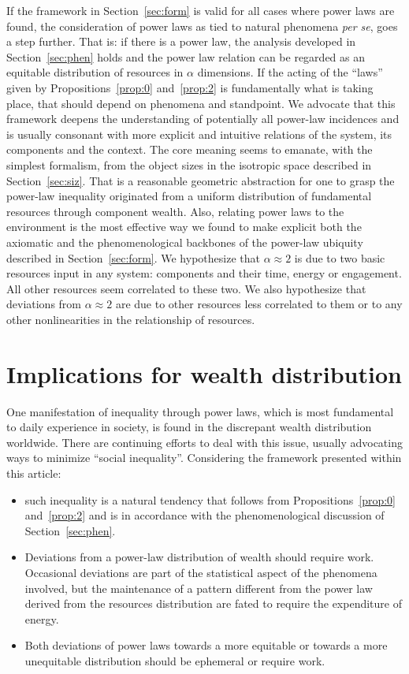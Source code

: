\documentclass[10pt,letterpaper]{article}
\begin{document}
If the framework in Section~\ref{sec:form} is valid for all cases where power laws are found,
the consideration of power laws as tied to natural phenomena \emph{per se}, goes a step further. 
That is: if there is
a power law, the analysis developed in Section~\ref{sec:phen} holds
and
the power law relation can be regarded as an equitable distribution
of resources in $\alpha$ dimensions.
If the acting of the ``laws'' given by Propositions~\ref{prop:0} and~\ref{prop:2} is fundamentally what is taking place, that should depend on phenomena
and standpoint.
We advocate that this framework deepens the understanding of potentially all power-law
incidences and is usually consonant with more explicit and intuitive 
relations of the system, its components and the context.
The core meaning seems to emanate, with the simplest formalism, from
the object sizes in the isotropic space described in Section~\ref{sec:siz}.
That is a reasonable geometric abstraction for
one to grasp the power-law inequality originated from
a uniform distribution
of fundamental resources through component wealth.
Also, relating power laws to the environment is the most effective
way we found to make explicit both the axiomatic
and the phenomenological backbones of the power-law ubiquity described in
Section~\ref{sec:form}.
We hypothesize that $\alpha \approx 2$ is due to two basic resources
input in any system: components and their time, energy or engagement.
All other resources seem correlated to these two.
We also hypothesize that deviations from $\alpha \approx 2$ are due
to other resources less correlated to them
or to any other nonlinearities in the relationship of resources.

\section{Implications for wealth distribution}\label{sec:esp}

One manifestation of inequality through power laws,
which is most fundamental to daily experience
in society, is found in the discrepant wealth distribution worldwide.
There are continuing efforts to deal with this issue,
usually advocating ways to minimize ``social inequality''.
Considering the framework presented within this article:

\begin{itemize}
	\item such inequality is a natural tendency that follows from Propositions~\ref{prop:0} and~\ref{prop:2} and is in accordance with the phenomenological discussion of Section~\ref{sec:phen}.
	\item Deviations from a power-law distribution of wealth should require work.
		Occasional deviations are part of the statistical aspect of the phenomena involved, but the maintenance of a pattern different from the power law derived from the resources distribution are fated to require the expenditure of energy.
	\item Both deviations of power laws towards a more equitable or towards a more unequitable distribution should be ephemeral or require work.
\end{itemize}
\end{document}
